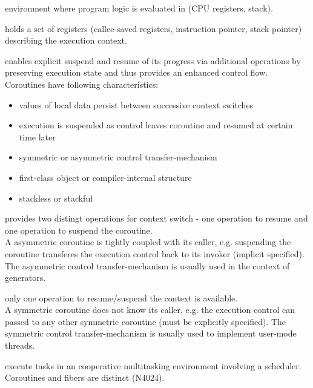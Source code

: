 
environment where program logic is evaluated in (CPU registers, stack).

holds a set of registers (callee-saved registers, instruction pointer, stack
pointer) describing the execution context.

enables explicit suspend and resume of its progress via additional operations by
preserving execution state and thus provides an enhanced control flow.
Coroutines have following characteristics\cite{N3985}:
\begin{itemize}
    \item values of local data persist between successive context switches
    \item execution is suspended as control leaves coroutine and resumed at
          certain time later
    \item symmetric or asymmetric control transfer-mechanism
    \item first-class object or compiler-internal structure
    \item stackless or stackful
\end{itemize}

provides two distingt operations for context switch - one operation to
resume and one operation to suspend the coroutine.\\
A asymmetric coroutine is tightly coupled with its caller, e.g. suspending
the coroutine transferes the execution control back to its invoker (implicit
specified). The asymmetric control transfer-mechanism is usually used in the
context of generators.

only one operation to resume/suspend the context is available.\\
A symmetric coroutine does not know its caller, e.g. the execution control can
passed to any other symmetric coroutine (must be explicitly specified). The
symmetric control transfer-mechanism is usually used to implement user-mode
threads.

execute tasks in an cooperative multitasking environment involving a
scheduler. Coroutines and fibers are distinct (N4024\cite{N4024}).

